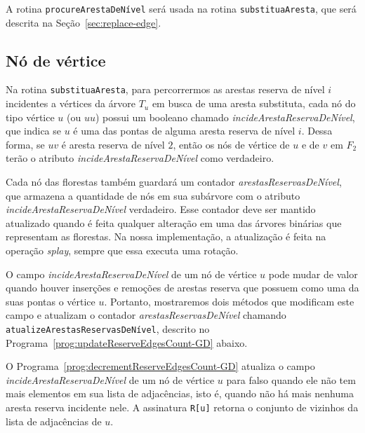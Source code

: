A rotina \texttt{procureArestaDeNível} será usada na rotina \texttt{substituaAresta}, que será descrita na Seção~\ref{sec:replace-edge}.

\subsection{Nó de vértice}
\label{sec:node-vertex}

Na rotina \texttt{substituaAresta}, para percorrermos as arestas reserva de nível $i$ incidentes a vértices da árvore $T_u$ em busca de uma aresta substituta, cada nó do tipo vértice $u$ (ou $uu$) possui um booleano chamado \textit{incideArestaReservaDeNível}, que indica se $u$ é uma das pontas de alguma aresta reserva de nível $i$. Dessa forma, se $uv$ é aresta reserva de nível $2$, então os nós de vértice de $u$ e de $v$ em $F_2$ terão o atributo \textit{incideArestaReservaDeNível} como verdadeiro. 

Cada nó das florestas também guardará um contador \textit{arestasReservasDeNível}, que armazena a quantidade de nós em sua subárvore com o atributo \textit{incideArestaReservaDeNível} verdadeiro. Esse contador deve ser mantido atualizado quando é feita qualquer alteração em uma das árvores binárias que representam as florestas. Na nossa implementação, a atualização é feita na operação \textit{splay}, sempre que essa executa uma rotação. 

O campo \textit{incideArestaReservaDeNível} de um nó de vértice $u$ pode mudar de valor quando houver inserções e remoções de arestas reserva que possuem como uma da suas pontas o vértice $u$. Portanto, mostraremos dois métodos que modificam este campo e atualizam o contador \textit{arestasReservasDeNível} chamando \texttt{atualizeArestasReservasDeNível}, descrito no Programa~\ref{prog:updateReserveEdgesCount-GD} abaixo.  

O Programa~\ref{prog:decrementReserveEdgesCount-GD} atualiza o campo \textit{incideArestaReservaDeNível} de um nó de vértice $u$ para falso quando ele não tem mais elementos em sua lista de adjacências, isto é, quando não há mais nenhuma aresta reserva incidente nele. A assinatura \texttt{R[u]} retorna o conjunto de vizinhos da lista de adjacências de $u$.

